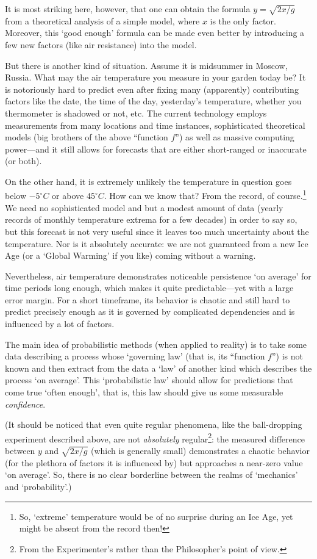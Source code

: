 \documentclass[12pt,notitlepage]{article}
\theoremstyle{plain}
\theoremstyle{definition}
\theoremstyle{plain}
\newcommand{\1}{\mathbf{1}}
\newcommand{\0}{\mathbf{0}}
\begin{document}
It is most striking here, however, that one can obtain the formula $y = \sqrt{2x/g}$ from a theoretical analysis of a simple model, where $x$ is the only factor. Moreover, this `good enough' formula can be made even better by introducing a few new factors (like air resistance) into the model.

But there is another kind of situation. Assume it is midsummer in Moscow, Russia. What may the air temperature you measure in your garden today be? It is notoriously hard to predict even after fixing many (apparently) contributing factors like the date, the time of the day, yesterday's temperature, whether you thermometer is shadowed or not, etc. The current technology employs measurements from many locations and time instances, sophisticated theoretical models (big brothers of the above ``function $f$'') as well as massive computing power---and it still allows for forecasts that are either short-ranged or inaccurate (or both).

On the other hand, it is extremely unlikely the temperature in question goes below $-5^\circ C$ or above $45^\circ C$. How can we know that? From the record, of course.\footnote{So, `extreme' temperature would be of no surprise during an Ice Age, yet might be absent from the record then!} We need no sophisticated model and but a modest amount of data (yearly records of monthly temperature extrema for a few decades) in order to say so, but this forecast is not very useful since it leaves too much uncertainty about the temperature. Nor is it absolutely accurate: we are not guaranteed from a new Ice Age (or a `Global Warming' if you like) coming without a warning.

Nevertheless, air temperature demonstrates noticeable persistence `on average' for time periods long enough, which makes it quite predictable---yet with a large error margin. For a short timeframe, its behavior is chaotic and still hard to predict precisely enough as it is governed by complicated dependencies and is influenced by a lot of factors.

The main idea of probabilistic methods (when applied to reality) is to take some data describing a process whose `governing law' (that is, its ``function $f$'') is not known and then extract from the data a `law' of another kind which describes the process `on average'. This `probabilistic law' should allow for predictions that come true `often enough', that is, this law should give us some measurable \emph{confidence}.

(It should be noticed that even quite regular phenomena, like the ball-dropping experiment described above, are not \emph{absolutely} regular\footnote{From the Experimenter's rather than the Philosopher's point of view.}: the measured difference between $y$ and $\sqrt{2x/g}$ (which is generally small) demonstrates a chaotic behavior (for the plethora of factors it is influenced by) but approaches a near-zero value `on average'. So, there is no clear borderline between the realms of `mechanics' and `probability'.)
\end{document}
